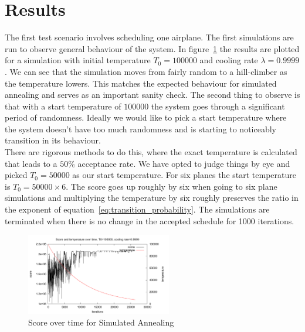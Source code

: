 \documentclass[journal]{IEEEtran}
\begin{document}
\section{Results}
The first test scenario involves scheduling one airplane. The first simulations are run to observe general behaviour of the system. In figure~\ref{fig:simulated_annealing_score} the results are plotted for a simulation with initial temperature $T_0=\num{100000}$ and cooling rate $\lambda=0.9999$. We can see that the simulation moves from fairly random to a hill-climber as the temperature lowers. This matches the expected behaviour for simulated annealing and serves as an important sanity check. The second thing to observe is that with a start temperature of $\num{100000}$ the system goes through a significant period of randomness. Ideally we would like to pick a start temperature where the system doesn't have too much randomness and is starting to noticeably transition in its behaviour.\\
There are rigorous methods to do this, where the exact temperature is calculated that leads to a $50\%$ acceptance rate. We have opted to judge things by eye and picked $T_0=\num{50000}$ as our start temperature. For six planes the start temperature is $T_0=\num{50000} \times 6$. The score goes up roughly by six when going to six plane simulations and multiplying the temperature by six roughly preserves the ratio in the exponent of equation~\ref{eq:transition_probability}. The simulations are terminated when there is no change in the accepted schedule for 1000 iterations. \\
\begin{figure}[H]
\centering
\includegraphics[width=2.5in]{score_over_time}
\caption{Score over time for Simulated Annealing}
\label{fig:simulated_annealing_score}
\end{figure}
\end{document}
